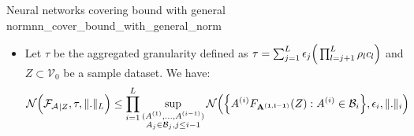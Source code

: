 \begin{theorem}{Neural networks covering bound with general norm}{nn_cover_bound_with_general_norm}
\begin{itemize}
        \item Let $\tau$ be the aggregated granularity defined as $\tau = \sum_{j=1}^L \epsilon_j \Big( \prod_{l=j+1}^L \rho_lc_l \Big)$ and $Z\subset\mathcal{V}_0$ be a sample dataset. We have:
        \begin{align*}
            \mathcal{N}\Big( 
                {\mathcal{F}_\mathcal{A}}_{|Z}, \tau, \|.\|_L
             \Big) \le \prod_{i=1}^L \sup_{\substack{
                (A^{(1)}, \dots, A^{(i-1)}) \\
                A_j \in \mathcal{B}_j, j \le i-1
            }}\mathcal{N}\Big( 
                \Big\{ A^{(i)}F_{\bf A^{(1, i-1)}}(Z) : A^{(i)} \in \mathcal{B}_i \Big\}, \epsilon_i, \|.\|_i
             \Big)
        \end{align*}
    \end{itemize}
\end{theorem}

